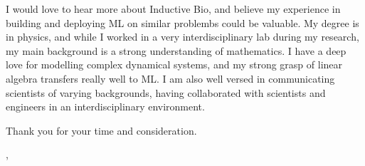 \documentclass[12pt]{letter}
\begin{document}
I would love to hear more about Inductive Bio, and believe my
experience in building and deploying ML on similar problembs could be valuable.
My degree is in physics, and while I worked in a very
interdisciplinary lab during my research,
my main background is a strong understanding of mathematics.
I have a deep love for modelling complex dynamical systems, and my strong
grasp of linear algebra transfers really well to ML.
I am also well versed in communicating scientists of varying
backgrounds, having collaborated with scientists and engineers in an
interdisciplinary environment.

Thank you for your time and consideration.

\vspace{0.1in}
\vfill

\begin{flushright}
  \closer, \\
  \myname\\
  \mytitle
\end{flushright}

\printbibliography[heading = none]
\end{document}
